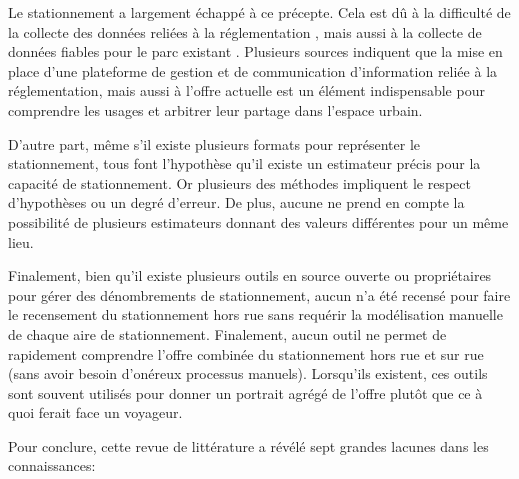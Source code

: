     Le stationnement a largement échappé à ce précepte. Cela est dû à la difficulté de la collecte des données reliées à la réglementation \parencite{axelrod_automating_2023}, mais aussi à la collecte de données fiables pour le parc existant \parencite{morency_stationnement_2017,heran_consommation_2008}. Plusieurs sources \parencite{morency_stationnement_2017,xu_national_2023,bronin_how_2023,currans_households_2023} indiquent que la mise en place d'une plateforme de gestion et de communication d'information reliée à la réglementation, mais aussi à l'offre actuelle est un élément indispensable pour comprendre les usages et arbitrer leur partage dans l'espace urbain.\par
    D'autre part, même s'il existe plusieurs formats pour représenter le stationnement\parencite{eros_curblr_2025,osm_contributors_amenity_2025,organisation_internationale_de_normalisation_intelligent_2023}, tous font l'hypothèse qu'il existe un estimateur précis pour la capacité de stationnement. Or plusieurs des méthodes impliquent le respect d'hypothèses ou un degré d'erreur. De plus, aucune ne prend en compte la possibilité de plusieurs estimateurs  donnant des valeurs différentes pour un même lieu. \par
    Finalement, bien qu'il existe plusieurs outils en source ouverte \parencite{osm_contributors_openstreetmap_2025,eros_curblr_2025,open_mobility_foundation_curb_2024-1, seidel_methodenbericht_2021} ou propriétaires \parencite{arcadis_curbiq_2025,populus_curb_2025} pour gérer des dénombrements de stationnement, aucun n'a été recensé pour faire le recensement du stationnement hors rue sans requérir la modélisation manuelle de chaque aire de stationnement. Finalement, aucun outil ne permet de rapidement comprendre l'offre combinée du stationnement hors rue et sur rue (sans avoir besoin d'onéreux processus manuels). Lorsqu'ils existent, ces outils sont souvent utilisés pour donner un portrait agrégé de l'offre plutôt que ce à quoi ferait face un voyageur.\par
    Pour conclure, cette revue de littérature a révélé sept grandes lacunes dans les connaissances:
